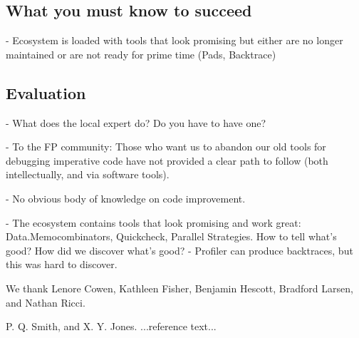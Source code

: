 \documentclass[preprint,nonatbib,blockstyle,nocopyrightspace,times]{sigplanconf}
\begin{document}

\subsection{What you must know to succeed}
- Ecosystem is loaded with tools that look promising but either are no longer maintained or are not ready for prime time (Pads, Backtrace)

\subsection{Evaluation}
- What does the local expert do? Do you have to have one?

- To the FP community: Those who want us to abandon our old tools for debugging imperative code have not provided a clear path to follow (both intellectually, and via software tools).

- No obvious body of knowledge on code improvement.

- The ecosystem contains tools that look promising and work great: Data.Memocombinators, Quickcheck, Parallel Strategies.
How to tell what's good? How did we discover what's good?
- Profiler can produce backtraces, but this was hard to discover.

% 

\acks

We thank Lenore Cowen, Kathleen Fisher, Benjamin Hescott, Bradford Larsen, and Nathan Ricci.





\begin{thebibliography}{}
\softraggedright

P. Q. Smith, and X. Y. Jones. ...reference text...

\end{thebibliography}
\end{document}
